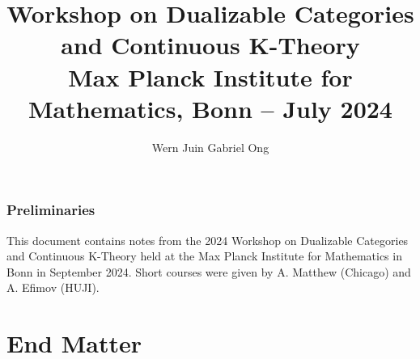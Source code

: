 \documentclass{amsart}
\theoremstyle{definition}
\numberwithin{equation}{section}
\begin{document}
\large
\title[Dualizable Categories and Continuous K-Theory -- MPIM 2024]{Workshop on Dualizable Categories and Continuous K-Theory \\ Max Planck Institute for Mathematics, Bonn -- July 2024}
\author{Wern Juin Gabriel Ong}
\address{Bowdoin College, Brunswick, Maine 04011}
\maketitle
\section*{Preliminaries}
This document contains notes from the 2024 Workshop on Dualizable Categories and Continuous K-Theory held at the Max Planck Institute for Mathematics in Bonn in September 2024. Short courses were given by A. Matthew (Chicago) and A. Efimov (HUJI). 
\newpage
\tableofcontents
\newpage
\part*{End Matter}
\printbibliography
\end{document}
